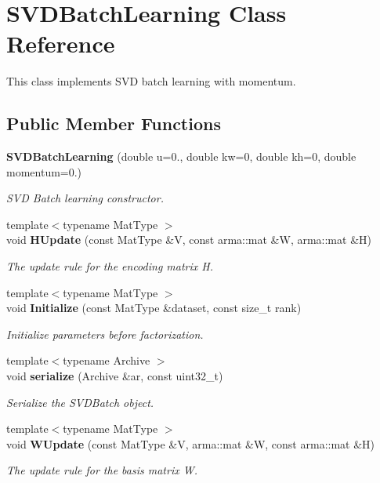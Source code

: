 \section{S\+V\+D\+Batch\+Learning Class Reference}
\label{classmlpack_1_1amf_1_1SVDBatchLearning}


This class implements S\+VD batch learning with momentum.  


\subsection*{Public Member Functions}
\begin{DoxyCompactItemize}
\item 
\textbf{ S\+V\+D\+Batch\+Learning} (double u=0., double kw=0, double kh=0, double momentum=0.)
\begin{DoxyCompactList}\small\item\em S\+VD Batch learning constructor. \end{DoxyCompactList}\item 
{\footnotesize template$<$typename Mat\+Type $>$ }\\void \textbf{ H\+Update} (const Mat\+Type \&V, const arma\+::mat \&W, arma\+::mat \&H)
\begin{DoxyCompactList}\small\item\em The update rule for the encoding matrix H. \end{DoxyCompactList}\item 
{\footnotesize template$<$typename Mat\+Type $>$ }\\void \textbf{ Initialize} (const Mat\+Type \&dataset, const size\+\_\+t rank)
\begin{DoxyCompactList}\small\item\em Initialize parameters before factorization. \end{DoxyCompactList}\item 
{\footnotesize template$<$typename Archive $>$ }\\void \textbf{ serialize} (Archive \&ar, const uint32\+\_\+t)
\begin{DoxyCompactList}\small\item\em Serialize the S\+V\+D\+Batch object. \end{DoxyCompactList}\item 
{\footnotesize template$<$typename Mat\+Type $>$ }\\void \textbf{ W\+Update} (const Mat\+Type \&V, arma\+::mat \&W, const arma\+::mat \&H)
\begin{DoxyCompactList}\small\item\em The update rule for the basis matrix W. \end{DoxyCompactList}\end{DoxyCompactItemize}


